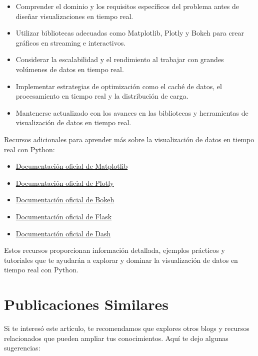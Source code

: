 \documentclass[
  a4paper,
]{article}
\providecommand{\tightlist}{%
  \setlength{\itemsep}{0pt}\setlength{\parskip}{0pt}}\usepackage{longtable,booktabs,array}
\begin{document}
\begin{itemize}
\tightlist
\item
  Comprender el dominio y los requisitos específicos del problema antes
  de diseñar visualizaciones en tiempo real.
\item
  Utilizar bibliotecas adecuadas como Matplotlib, Plotly y Bokeh para
  crear gráficos en streaming e interactivos.
\item
  Considerar la escalabilidad y el rendimiento al trabajar con grandes
  volúmenes de datos en tiempo real.
\item
  Implementar estrategias de optimización como el caché de datos, el
  procesamiento en tiempo real y la distribución de carga.
\item
  Mantenerse actualizado con los avances en las bibliotecas y
  herramientas de visualización de datos en tiempo real.
\end{itemize}

Recursos adicionales para aprender más sobre la visualización de datos
en tiempo real con Python:

\begin{itemize}
\tightlist
\item
  \href{https://matplotlib.org/stable/contents.html}{Documentación
  oficial de Matplotlib}
\item
  \href{https://plotly.com/python/}{Documentación oficial de Plotly}
\item
  \href{https://docs.bokeh.org/en/latest/index.html}{Documentación
  oficial de Bokeh}
\item
  \href{https://flask.palletsprojects.com/}{Documentación oficial de
  Flask}
\item
  \href{https://dash.plotly.com/}{Documentación oficial de Dash}
\end{itemize}

Estos recursos proporcionan información detallada, ejemplos prácticos y
tutoriales que te ayudarán a explorar y dominar la visualización de
datos en tiempo real con Python.

\hypertarget{publicaciones-similares}{%
\section{Publicaciones Similares}\label{publicaciones-similares}}

Si te interesó este artículo, te recomendamos que explores otros blogs y
recursos relacionados que pueden ampliar tus conocimientos. Aquí te dejo
algunas sugerencias:
\end{document}
